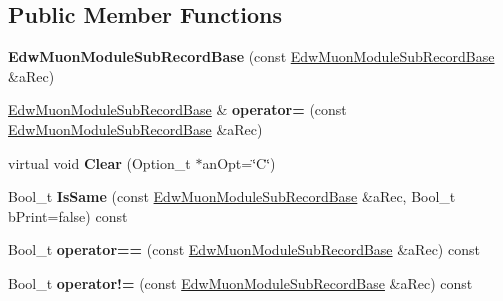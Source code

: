 \subsection*{Public Member Functions}
\begin{DoxyCompactItemize}
\item 
\hypertarget{class_edw_muon_module_sub_record_base_a9792e7b635731adf7476229e07ad4c89}{
{\bfseries EdwMuonModuleSubRecordBase} (const \hyperlink{class_edw_muon_module_sub_record_base}{EdwMuonModuleSubRecordBase} \&aRec)}
\label{class_edw_muon_module_sub_record_base_a9792e7b635731adf7476229e07ad4c89}

\item 
\hypertarget{class_edw_muon_module_sub_record_base_ab9693fefec325acd7ed05aa96cdc2ab9}{
\hyperlink{class_edw_muon_module_sub_record_base}{EdwMuonModuleSubRecordBase} \& {\bfseries operator=} (const \hyperlink{class_edw_muon_module_sub_record_base}{EdwMuonModuleSubRecordBase} \&aRec)}
\label{class_edw_muon_module_sub_record_base_ab9693fefec325acd7ed05aa96cdc2ab9}

\item 
\hypertarget{class_edw_muon_module_sub_record_base_adb0ad1f78940f7f00c31400069817528}{
virtual void {\bfseries Clear} (Option\_\-t $\ast$anOpt=\char`\"{}C\char`\"{})}
\label{class_edw_muon_module_sub_record_base_adb0ad1f78940f7f00c31400069817528}

\item 
\hypertarget{class_edw_muon_module_sub_record_base_af1ba4aeb2bfdeacc51edd30f2fe23d56}{
Bool\_\-t {\bfseries IsSame} (const \hyperlink{class_edw_muon_module_sub_record_base}{EdwMuonModuleSubRecordBase} \&aRec, Bool\_\-t bPrint=false) const }
\label{class_edw_muon_module_sub_record_base_af1ba4aeb2bfdeacc51edd30f2fe23d56}

\item 
\hypertarget{class_edw_muon_module_sub_record_base_a0dcd2d0f2ad8d95740a7d4c3eca6f555}{
Bool\_\-t {\bfseries operator==} (const \hyperlink{class_edw_muon_module_sub_record_base}{EdwMuonModuleSubRecordBase} \&aRec) const }
\label{class_edw_muon_module_sub_record_base_a0dcd2d0f2ad8d95740a7d4c3eca6f555}

\item 
\hypertarget{class_edw_muon_module_sub_record_base_a6ff762654125ced588dde4f2cd603df4}{
Bool\_\-t {\bfseries operator!=} (const \hyperlink{class_edw_muon_module_sub_record_base}{EdwMuonModuleSubRecordBase} \&aRec) const }
\label{class_edw_muon_module_sub_record_base_a6ff762654125ced588dde4f2cd603df4}


\end{DoxyCompactItemize}
